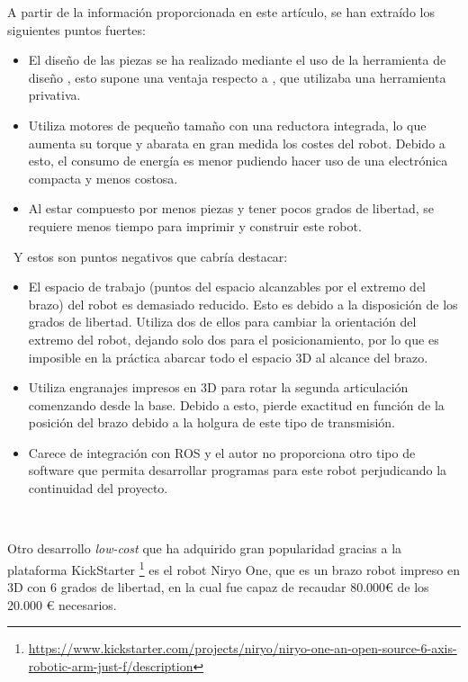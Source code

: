     A partir de la información proporcionada en este artículo, se han extraído los siguientes puntos fuertes:
    \begin{itemize}
        \item El diseño de las piezas se ha realizado mediante el uso de la herramienta de diseño , esto supone una ventaja respecto 
        a \cite{KRIMPENIS2020103}, que utilizaba una herramienta privativa.
        \item Utiliza motores de pequeño tamaño con una reductora integrada, lo que aumenta su torque y abarata en gran medida los costes 
        del robot. Debido a esto, el consumo de energía es menor pudiendo hacer uso de una electrónica compacta y menos costosa.
        \item Al estar compuesto por menos piezas y tener pocos grados de libertad, se requiere menos tiempo para imprimir y construir este robot.
    \end{itemize}\
    Y estos son puntos negativos que cabría destacar:
    \begin{itemize}
        \item El espacio de trabajo (puntos del espacio alcanzables por el extremo del brazo) del robot es demasiado reducido. Esto es debido 
        a la disposición de los grados de libertad. Utiliza dos de ellos para cambiar la orientación del extremo del robot, dejando solo dos para el 
        posicionamiento, por lo que es imposible en la práctica abarcar todo el espacio 3D al alcance del brazo.
        \item Utiliza engranajes impresos en 3D para rotar la segunda articulación comenzando desde la base. Debido a esto, pierde exactitud en función 
        de la posición del brazo debido a la holgura de este tipo de transmisión.
        \item Carece de integración con \ac{ROS} y el autor no proporciona otro tipo de software que permita desarrollar programas para este robot perjudicando la 
        continuidad del proyecto.
    \end{itemize}\

    Otro desarrollo \textit{low-cost} que ha adquirido gran popularidad
    gracias a la plataforma KickStarter \footnote{\url{https://www.kickstarter.com/projects/niryo/niryo-one-an-open-source-6-axis-robotic-arm-just-f/description}} 
    es el robot Niryo One, que es un brazo robot impreso en 3D con 6 grados de libertad, en la cual fue 
    capaz de recaudar 80.000\euro \xspace de los 20.000 \euro \xspace necesarios. 


